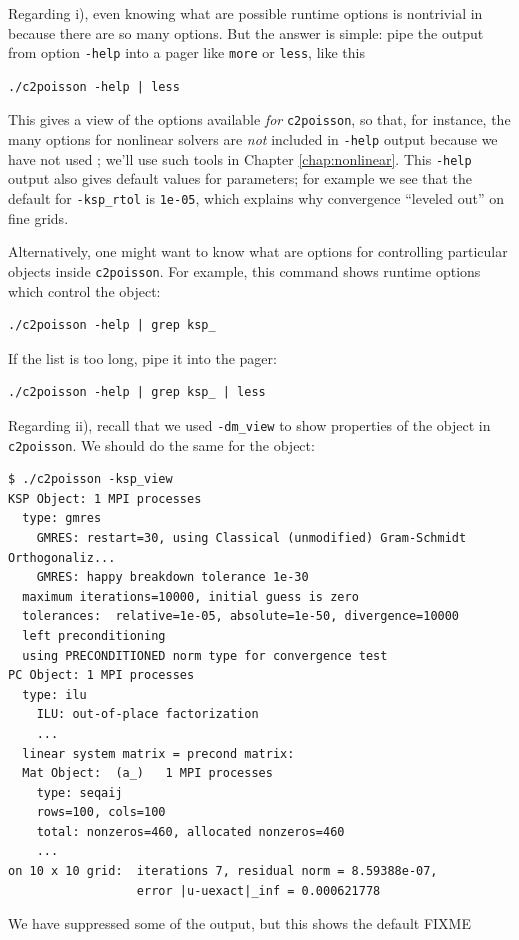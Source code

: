 Regarding i), even knowing what are possible runtime options is nontrivial in \PETSc because there are so many options.  But the answer is simple: pipe the output from option \texttt{-help} into a pager like \texttt{more} or \texttt{less}, like this
\begin{Verbatim}[fontsize=\small]
./c2poisson -help | less
\end{Verbatim}
This gives a view of the options available \emph{for} \texttt{c2poisson}, so that, for instance, the many options for nonlinear solvers are \emph{not} included in \texttt{-help} output because we have not used \pSNES; we'll use such tools in Chapter \ref{chap:nonlinear}.  This \texttt{-help} output also gives default values for parameters; for example we see that the default for \texttt{-ksp\_rtol} is \texttt{1e-05}, which explains why convergence ``leveled out'' on fine grids.

Alternatively, one might want to know what are options for controlling particular objects inside \texttt{c2poisson}.  For example, this command shows runtime options which control the \pKSP object:
\begin{Verbatim}[fontsize=\small]
./c2poisson -help | grep ksp_
\end{Verbatim}
If the list is too long, pipe it into the pager:
\begin{Verbatim}[fontsize=\small]
./c2poisson -help | grep ksp_ | less
\end{Verbatim}

Regarding ii), recall that we used \texttt{-dm\_view} to show properties of the \pDM object in \texttt{c2poisson}.  We should do the same for the \pKSP object:
\begin{Verbatim}[fontsize=\small]
$ ./c2poisson -ksp_view
KSP Object: 1 MPI processes
  type: gmres
    GMRES: restart=30, using Classical (unmodified) Gram-Schmidt Orthogonaliz...
    GMRES: happy breakdown tolerance 1e-30
  maximum iterations=10000, initial guess is zero
  tolerances:  relative=1e-05, absolute=1e-50, divergence=10000
  left preconditioning
  using PRECONDITIONED norm type for convergence test
PC Object: 1 MPI processes
  type: ilu
    ILU: out-of-place factorization
    ...
  linear system matrix = precond matrix:
  Mat Object:  (a_)   1 MPI processes
    type: seqaij
    rows=100, cols=100
    total: nonzeros=460, allocated nonzeros=460
    ...
on 10 x 10 grid:  iterations 7, residual norm = 8.59388e-07,
                  error |u-uexact|_inf = 0.000621778
\end{Verbatim}
We have suppressed some of the output, but this shows the default FIXME

